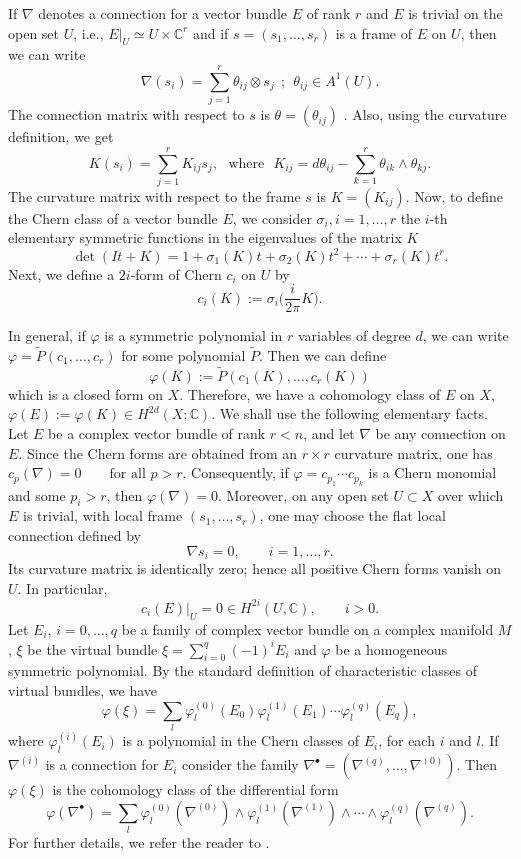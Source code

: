 \documentclass[12pt,reqno,a4paper]{amsart}
\numberwithin{equation}{section}
\theoremstyle{plain}
\theoremstyle{definition}
\begin{document}
If $\nabla$ denotes a connection for a vector bundle $E$ of rank $r$ and $E$ is trivial on the open set $U$, i.e., $E|_{U} \simeq U \times \mathbb{C}^{r}$ and if $ s = ( s_{1},\ldots,s_{r})$ is a frame of $E$ on $U$, then we can write
$$ \nabla (s_{i}) = \sum_{j = 1}^{r} \theta_{ij} \otimes s_{j} \ \ ; \ \ \theta_{ij} \in A^{1}(U). $$
The connection matrix with respect to $s$ is $\theta = (\theta_{ij})$ . Also, using the curvature definition, we get
$$ K(s_{i}) = \sum_{j = 1}^{r}K_{ij}s_{j}, \ \ \ \mbox{where} \ \ \ K_{ij} = d \theta_{ij} - \sum_{k =1}^{r} \theta_{ik} \wedge \theta_{kj}.$$
The curvature matrix with respect to the frame $s$ is $K = (K_{ij})$. Now, to define the Chern class of a vector bundle $E$, we consider $\sigma_{i}, i = 1,\ldots,r$ the $i$-th elementary symmetric functions in the eigenvalues of the matrix $K$
$$ \det(It + K) = 1 + \sigma_{1}(K)t + \sigma_{2}(K)t^{2} + \cdots + \sigma_{r}(K)t^{r}. $$
Next, we define a $2i$-form of Chern $c_{i}$ on $U$ by
$$ c_{i}(K) := \sigma_{i} \Big(\frac{{   i}}{2 \pi}K\Big). $$

In general, if $\varphi$ is a symmetric polynomial  in $r$ variables of degree $d$, we can write $\varphi = \tilde{P}(c_{1},\ldots,c_{r})$ for some polynomial $\tilde{P}$. Then we can define
$$ \varphi(K) := \tilde{P}(c_{1}(K),\ldots,c_{r}(K))$$
\noindent which is a closed form on $X$. Therefore, we have a cohomology class of $E$ on $X$, $\varphi (E) := \varphi(K) \in H^{2d}(X; \mathbb{C})$. 
We shall use the following elementary facts. Let $E$ be a complex vector bundle
of rank $r<n$, and let $\nabla$ be any connection on $E$. Since the Chern forms
are obtained from an $r\times r$ curvature matrix, one has
$
c_p(\nabla)=0 \qquad \text{for all } p>r.
$
Consequently, if
$
\varphi=c_{p_1}\cdots c_{p_k}
$
is a Chern monomial and some $p_i>r$, then
$
\varphi(\nabla)=0.$
Moreover, on any open set $U\subset X$ over which $E$ is trivial, with local
frame $(s_1,\ldots,s_r)$, one may choose the flat local connection defined by
\[
\nabla s_i=0,\qquad i=1,\ldots,r.
\]
Its curvature matrix is identically zero; hence all positive Chern forms vanish
on $U$. In particular,
\[
c_i(E)|_U=0\in H^{2i}(U,\mathbb C),\qquad i>0.
\]
Let  $E_i$, $i=0,\ldots,q$ be a family of complex vector bundle on a complex manifold $M$, $ \xi$ be the virtual bundle $\displaystyle \xi=\sum _{i=0} ^{q}(-1)^i E_i$ and $\varphi$ be a  homogeneous symmetric polynomial. By the standard definition of characteristic classes of virtual bundles, we have $$\varphi(\xi)=\sum _{l} \varphi_l ^{(0)} (E_0)\varphi_l ^{(1)}(E_1)\cdots\varphi_l ^{(q)}(E_q),$$ where $\varphi_l ^{(i)}(E_i)$ is a polynomial in the Chern classes of $E_i$, for each $i$ and $l$.
If $\nabla^{(i)}$ is a connection for $E_i$ consider the family $\nabla^{\bullet}=(\nabla^{(q)},\ldots,\nabla^{(0)}).$ Then $\varphi(\xi)$ is the cohomology class of the differential form 
\begin{equation} \varphi(\nabla^{\bullet})=\sum _{l} \varphi_l ^{(0)} (\nabla^{(0)} )\wedge\varphi_l ^{(1)}(\nabla^{(1)})\wedge\cdots\wedge\varphi_l ^{(q)}(\nabla^{(q)}).\end{equation}
For further details, we refer the reader to \cite{Suwa}.
\end{document}
